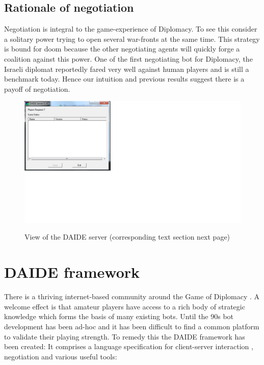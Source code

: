 \documentclass[pdftex,11pt,a4paper]{report}
\begin{document}
\subsection{Rationale of negotiation}

Negotiation is integral to the game-experience of Diplomacy. To see 
this consider a solitary power trying to open several war-fronts at the same
time. This strategy is bound for doom because the other negotiating
agents will quickly forge a coalition against this power. One of the
first negotiating bot for Diplomacy, the Israeli diplomat \cite{Kraus89}
reportedly fared very well against human players and is still a 
benchmark today. Hence our intuition and previous results suggest there
is a payoff of negotiation.

\begin{figure}

\includegraphics[scale=0.75]{./images/DAIDEServer.png}

View of the DAIDE server (corresponding text section next page)

\end{figure}

\pagebreak

\section{DAIDE framework}

There is a thriving internet-based community around the Game of
Diplomacy \cite{DipArchive04} \cite{DipPouch04}. A welcome effect is
that amateur players have access to a rich body of strategic knowledge
which forms the basis of many existing bots. Until the 90s bot
development has been ad-hoc and it has been difficult to find a common
platform to validate their playing strength. To remedy this the DAIDE
framework \cite{Daide04} has been created: It comprises a language
specification for client-server interaction \cite{DAIDEsyntax10},
negotiation and various useful tools:
\end{document}
